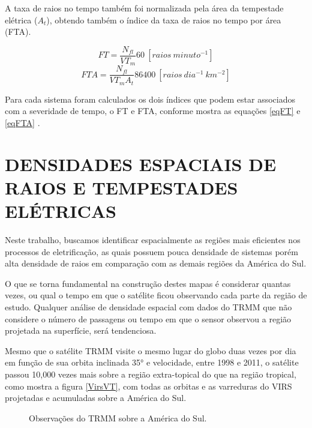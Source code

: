 
A taxa de raios no tempo também foi normalizada pela área da tempestade elétrica ($A_t$), obtendo também o índice da taxa de raios no tempo por área (FTA). 

\begin{equation}
FT = \frac{N_{fl} }{VT_m} 60 ~[raios~minuto^{-1}]  
\label{eqFT}  
\end{equation}
\begin{equation}
FTA = \frac{N_{fl} }{VT_m A_t } 86400 ~[raios~dia^{-1}~km^{-2}]
\label{eqFTA}
\end{equation}

Para cada sistema foram calculados os dois índices que podem estar associados com a severidade de tempo, o FT e FTA, conforme mostra as equações \ref{eqFT} e \ref{eqFTA} 
 .

\section{DENSIDADES ESPACIAIS DE RAIOS E TEMPESTADES ELÉTRICAS}

Neste trabalho, buscamos identificar espacialmente as regiões mais eficientes nos processos de eletrificação, as quais possuem pouca densidade de sistemas porém alta densidade de raios em comparação com as demais regiões da América do Sul.

O que se torna fundamental na construção destes mapas é considerar quantas vezes, ou qual o tempo em que o satélite ficou observando cada parte da região de estudo. Qualquer análise de densidade espacial com dados do TRMM que não considere o número de passagens ou tempo em que o sensor observou a região projetada na superfície, será tendenciosa.

Mesmo que o satélite TRMM visite o mesmo lugar do globo duas vezes por dia em função de sua orbita inclinada 35° e velocidade, entre 1998 e 2011, o satélite passou 10,000 vezes mais sobre a região extra-topical do que na região tropical, como mostra a figura \ref{VirsVT}, com todas as orbitas e as varreduras do VIRS projetadas e acumuladas sobre a América do Sul. 

\begin{figure}[!Hb]

\caption{Observações do TRMM sobre a América do Sul.}
\label{gridVT} 
\end{figure} 

